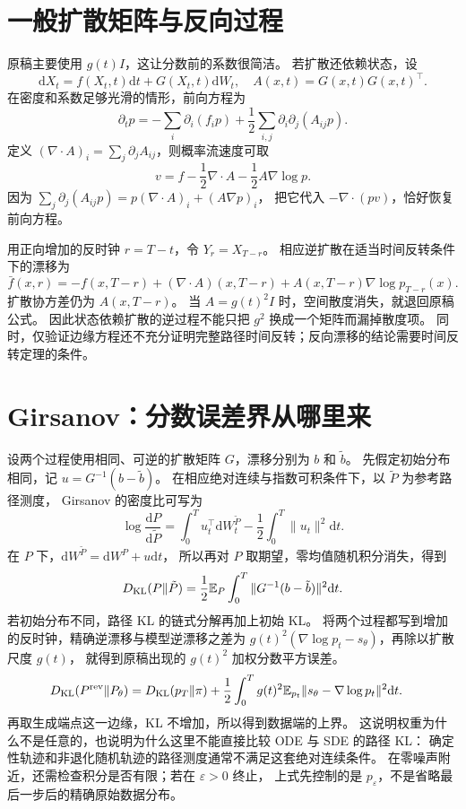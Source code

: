 \section{一般扩散矩阵与反向过程}
原稿主要使用 $g(t)I$，这让分数前的系数很简洁。
若扩散还依赖状态，设
\[
\mathrm dX_t=f(X_t,t)\mathrm dt+G(X_t,t)\mathrm dW_t,
\quad A(x,t)=G(x,t)G(x,t)^\top.
\]
在密度和系数足够光滑的情形，前向方程为
\[
\partial_tp=-\sum_i\partial_i(f_ip)
 +\frac12\sum_{i,j}\partial_i\partial_j(A_{ij}p).
\]
定义 $(\nabla\cdot A)_i=\sum_j\partial_j A_{ij}$，则概率流速度可取
\[
v=f-\frac12\nabla\cdot A-\frac12A\nabla\log p.
\label{supp:general-pf}
\]
因为 $\sum_j\partial_j(A_{ij}p)=p(\nabla\cdot A)_i+(A\nabla p)_i$，
把它代入 $-\nabla\cdot(pv)$，恰好恢复前向方程。

用正向增加的反时钟 $r=T-t$，令 $Y_r=X_{T-r}$。
相应逆扩散在适当时间反转条件下的漂移为
\[
\bar f(x,r)=-f(x,T-r)+(\nabla\cdot A)(x,T-r)
 +A(x,T-r)\nabla\log p_{T-r}(x).
\]
扩散协方差仍为 $A(x,T-r)$。
当 $A=g(t)^2I$ 时，空间散度消失，就退回原稿公式。
因此状态依赖扩散的逆过程不能只把 $g^2$ 换成一个矩阵而漏掉散度项。
同时，仅验证边缘方程还不充分证明完整路径时间反转；反向漂移的结论需要时间反转定理的条件。

\section{Girsanov：分数误差界从哪里来}
设两个过程使用相同、可逆的扩散矩阵 $G$，漂移分别为 $b$ 和 $\tilde b$。
先假定初始分布相同，记 $u=G^{-1}(b-\tilde b)$。
在相应绝对连续与指数可积条件下，以 $\tilde P$ 为参考路径测度，
Girsanov 的密度比可写为
\[
\log\frac{\mathrm dP}{\mathrm d\tilde P}
=\int_0^T u_t^\top\mathrm dW_t^{\tilde P}
 -\frac12\int_0^T\|u_t\|^2\mathrm dt.
\]
在 $P$ 下，$\mathrm dW^{\tilde P}=\mathrm dW^P+u\mathrm dt$，
所以再对 $P$ 取期望，零均值随机积分消失，得到
\[
D_{\rm KL}(P\|\tilde P)
=\frac12\mathbb E_P\int_0^T
 \|G^{-1}(b-\tilde b)\|^2\mathrm dt.
\]
若初始分布不同，路径 KL 的链式分解再加上初始 KL。
将两个过程都写到增加的反时钟，精确逆漂移与模型逆漂移之差为
$g(t)^2(\nabla\log p_t-s_\theta)$，再除以扩散尺度 $g(t)$，
就得到原稿出现的 $g(t)^2$ 加权分数平方误差。
\begin{align}
D_{\rm KL}(P^{\rm rev}\|P_\theta)
 &=D_{\rm KL}(p_T\|\pi)
 +\frac12\int_0^Tg(t)^2\mathbb E_{p_t}
  \|s_\theta-\nabla\log p_t\|^2\mathrm dt.
\label{supp:path-kl}
\end{align}
再取生成端点这一边缘，KL 不增加，所以得到数据端的上界。
这说明权重为什么不是任意的，也说明为什么这里不能直接比较 ODE 与 SDE 的路径 KL：
确定性轨迹和非退化随机轨迹的路径测度通常不满足这套绝对连续条件。
在零噪声附近，还需检查积分是否有限；若在 $\varepsilon>0$ 终止，
上式先控制的是 $p_\varepsilon$，不是省略最后一步后的精确原始数据分布。\cite{theorybook,sde}
